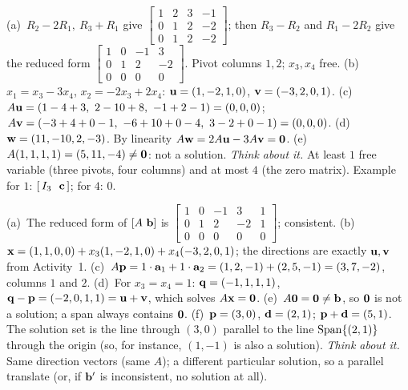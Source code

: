 \documentclass[11pt]{article}
\begin{document}
\begin{sol}
(a)~$R_2-2R_1,\ R_3+R_1$ give $\begin{bmatrix}1&2&3&-1\\0&1&2&-2\\0&1&2&-2\end{bmatrix}$; then $R_3-R_2$ and $R_1-2R_2$ give the reduced form $\begin{bmatrix}1&0&-1&3\\0&1&2&-2\\0&0&0&0\end{bmatrix}$. Pivot columns $1,2$; $x_3,x_4$ free.
(b)~$x_1=x_3-3x_4$, $x_2=-2x_3+2x_4$: $\mathbf{u}=(1,-2,1,0)$, $\mathbf{v}=(-3,2,0,1)$.
(c)~$A\mathbf{u}=(1-4+3,\ 2-10+8,\ -1+2-1)=(0,0,0)$; $A\bv{v}=(-3+4+0-1,\ -6+10+0-4,\ 3-2+0-1)=(0,0,0)$.
(d)~$\mathbf{w}=(11,-10,2,-3)$. By linearity $A\mathbf{w}=2A\mathbf{u}-3A\mathbf{v}=\mathbf{0}$.
(e)~$A(1,1,1,1)=(5,11,-4)\neq\mathbf{0}$: not a solution.
\emph{Think about it.} At least $1$ free variable (three pivots, four columns) and at most $4$ (the zero matrix). Example for $1$: $[\,I_3\ \ \mathbf{c}\,]$; for $4$: $0$.
\end{sol}

\begin{sol}
(a)~The reduced form of $[A\ \bv{b}]$ is $\begin{bmatrix}1&0&-1&3&1\\0&1&2&-2&1\\0&0&0&0&0\end{bmatrix}$; consistent.
(b)~$\mathbf{x}=(1,1,0,0)+x_3(1,-2,1,0)+x_4(-3,2,0,1)$; the directions are exactly $\mathbf{u},\mathbf{v}$ from Activity~1.
(c)~$A\mathbf{p}=1\cdot\mathbf{a}_1+1\cdot\mathbf{a}_2=(1,2,-1)+(2,5,-1)=(3,7,-2)$, columns $1$ and $2$.
(d)~For $x_3=x_4=1$: $\mathbf{q}=(-1,1,1,1)$, $\mathbf{q}-\mathbf{p}=(-2,0,1,1)=\mathbf{u}+\mathbf{v}$, which solves $A\mathbf{x}=\mathbf{0}$.
(e)~$A\mathbf{0}=\mathbf{0}\neq\mathbf{b}$, so $\mathbf{0}$ is not a solution; a span always contains $\mathbf{0}$.
(f)~$\mathbf{p}=(3,0)$, $\mathbf{d}=(2,1)$; $\mathbf{p}+\mathbf{d}=(5,1)$. The solution set is the line through $(3,0)$ parallel to the line $\operatorname{Span}\{(2,1)\}$ through the origin (so, for instance, $(1,-1)$ is also a solution).
\emph{Think about it.} Same direction vectors (same $A$); a different particular solution, so a parallel translate (or, if $\mathbf{b}'$ is inconsistent, no solution at all).
\end{sol}
\end{document}
